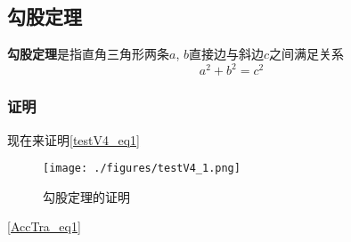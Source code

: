 
\subsection{勾股定理}
\textbf{勾股定理}是指直角三角形两条$a$, $b$直接边与斜边$c$之间满足关系
\begin{equation}\label{testV4_eq1}
a^2 + b^2 = c^2
\end{equation}

\subsubsection{证明}
现在来证明\autoref{testV4_eq1}

\begin{figure}[ht]
\centering
\texttt{[image: ./figures/testV4\_1.png]}
\caption{勾股定理的证明} \label{testV4_fig1}
\end{figure}
\autoref{AccTra_eq1}